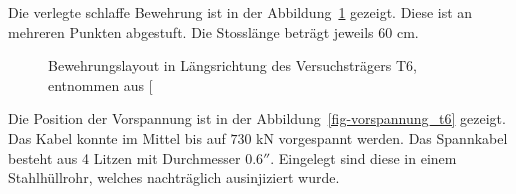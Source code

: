 \documentclass[
  11pt,
  letterpaper,
]{scrreprt}
\begin{document}
Die verlegte schlaffe Bewehrung ist in der
Abbildung~\ref{fig-bewehrung_laengs_t6} gezeigt. Diese ist an mehreren
Punkten abgestuft. Die Stosslänge beträgt jeweils \(60\) cm.

\begin{figure}[H]


\caption{\label{fig-bewehrung_laengs_t6}Bewehrungslayout in
Längsrichtung des Versuchsträgers T6, entnommen aus
{[}\citeproc{ref-sigrist_versuche_1993}{5}{]}}

\end{figure}%

Die Position der Vorspannung ist in der
Abbildung~\ref{fig-vorspannung_t6} gezeigt. Das Kabel konnte im Mittel
bis auf \(730\) kN vorgespannt werden. Das Spannkabel besteht aus 4
Litzen mit Durchmesser \(0.6''\). Eingelegt sind diese in einem
Stahlhüllrohr, welches nachträglich ausinjiziert wurde.
\end{document}
